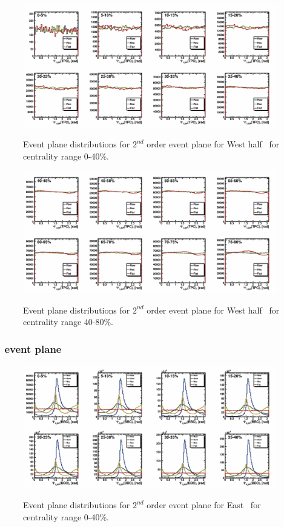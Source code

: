 \begin{figure}[ht]
    \includegraphics[width=0.99\textwidth]{Figures/PsiWest_harm0_0.png}
    \label{fig:TPC_West_EP1}
    \caption{Event plane distributions for $2^{nd}$ order event plane for West half \TPC\ for centrality range 0-40\%.}
\end{figure}

\begin{figure}[ht]
    \includegraphics[width=0.99\textwidth]{Figures/PsiWest_harm0_1.png}
    \label{fig:TPC_West_EP2}
    \caption{Event plane distributions for $2^{nd}$ order event plane for West half \TPC\ for centrality range 40-80\%.}
\end{figure}

\FloatBarrier
\subsubsection{\BBC\ event plane}

\begin{figure}[ht]
    \includegraphics[width=0.99\textwidth]{Figures/PsiEast_harm1_0.png}
    \label{fig:BBC_East_EP1}
    \caption{Event plane distributions for $2^{nd}$ order event plane for East \BBC\ for centrality range 0-40\%.}
\end{figure}

